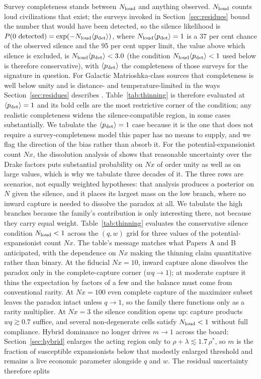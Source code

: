 \documentclass[11pt]{article}
\begin{document}
Survey completeness stands between $N_{\rm loud}$ and anything observed. $N_{\rm loud}$ counts loud civilizations that exist; the surveys invoked in Section~\ref{sec:residues} bound the number that would have been detected, so the silence likelihood is $P(0\ \mathrm{detected}) = \exp(-N_{\rm loud}\langle p_{\rm det}\rangle)$, where $N_{\rm loud}\langle p_{\rm det}\rangle = 1$ is a 37 per cent chance of the observed silence and the 95 per cent upper limit, the value above which silence is excluded, is $N_{\rm loud}\langle p_{\rm det}\rangle < 3.0$ (the condition $N_{\rm loud}\langle p_{\rm det}\rangle < 1$ used below is therefore conservative), with $\langle p_{\rm det}\rangle$ the completeness of those surveys for the signature in question. For Galactic Matrioshka-class sources that completeness is well below unity and is distance- and temperature-limited in the ways Section~\ref{sec:residues} describes \citep{Carrigan2009,Zackrisson2018}. Table~\ref{tab:thinning} is therefore evaluated at $\langle p_{\rm det}\rangle = 1$ and its bold cells are the most restrictive corner of the condition; any realistic completeness widens the silence-compatible region, in some cases substantially. We tabulate the $\langle p_{\rm det}\rangle = 1$ case because it is the one that does not require a survey-completeness model this paper has no means to supply, and we flag the direction of the bias rather than absorb it. For the potential-expansionist count $N x$, the dissolution analysis of \citet{SandbergDrexlerOrd2018} shows that reasonable uncertainty over the Drake factors puts substantial probability on $N x$ of order unity as well as on large values, which is why we tabulate three decades of it. The three rows are scenarios, not equally weighted hypotheses: that analysis produces a posterior on $N$ given the silence, and it places its largest mass on the low branch, where no inward capture is needed to dissolve the paradox at all. We tabulate the high branches because the family's contribution is only interesting there, not because they carry equal weight. Table~\ref{tab:thinning} evaluates the conservative silence condition $N_{\rm loud} < 1$ across the $(q, w)$ grid for three values of the potential-expansionist count $N x$. The table's message matches what Papers A and B anticipated, with the dependence on $N x$ making the thinning claim quantitative rather than binary. At the fiducial $N x = 10$, inward capture alone dissolves the paradox only in the complete-capture corner ($w q \to 1$); at moderate capture it thins the expectation by factors of a few and the balance must come from conventional rarity. At $N x = 100$ even complete capture of the maximizer subset leaves the paradox intact unless $q \to 1$, so the family there functions only as a rarity multiplier. At $N x = 3$ the silence condition opens up: capture products $w q \gtrsim 0.7$ suffice, and several non-degenerate cells satisfy $N_{\rm loud} < 1$ without full compliance. Hybrid dominance no longer drives $m \to 1$ across the board: Section~\ref{sec:hybrid} enlarges the acting region only to $\rho+\lambda \lesssim 1.7\,\rho^{*}$, so $m$ is the fraction of susceptible expansionists below that modestly enlarged threshold and remains a live economic parameter alongside $q$ and $w$. The residual uncertainty therefore splits 
\end{document}
